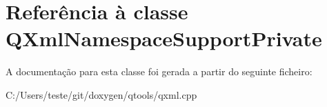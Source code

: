 \hypertarget{class_q_xml_namespace_support_private}{\section{Referência à classe Q\-Xml\-Namespace\-Support\-Private}
\label{class_q_xml_namespace_support_private}
}


A documentação para esta classe foi gerada a partir do seguinte ficheiro\-:\begin{DoxyCompactItemize}
\item 
C\-:/\-Users/teste/git/doxygen/qtools/qxml.\-cpp\end{DoxyCompactItemize}
